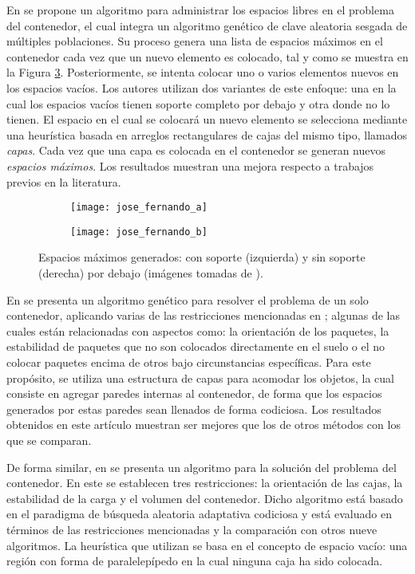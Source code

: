 En \cite{GONCALVES2012179} se propone un algoritmo para administrar los espacios libres en el problema del contenedor, el cual integra un algoritmo genético de clave aleatoria sesgada de múltiples poblaciones.
Su proceso genera una lista de espacios máximos en el contenedor cada vez que un nuevo elemento es colocado, tal y como se muestra en la Figura \ref{fig:GONCALVES2012179}.
Posteriormente, se intenta colocar uno o varios elementos nuevos en los espacios vacíos.
Los autores utilizan dos variantes de este enfoque: una en la cual los espacios vacíos tienen soporte completo por debajo y otra donde no lo tienen.
El espacio en el cual se colocará un nuevo elemento se selecciona mediante una heurística basada en arreglos rectangulares de cajas del mismo tipo, llamados \textsl{capas}.
Cada vez que una capa es colocada en el contenedor se generan nuevos \textsl{espacios máximos}.
Los resultados muestran una mejora respecto a trabajos previos en la literatura.
%
\begin{figure}[H]
	\begin{subfigure}{0.22\linewidth}
		\texttt{[image: jose\_fernando\_a]}%
		\label{subfig:con_soporte}%
	\end{subfigure}%
	\hspace{1.8cm}%
	\begin{subfigure}{0.22\textwidth}
		\texttt{[image: jose\_fernando\_b]}%
		\label{subfig:sin_soporte}%
	\end{subfigure}%
	\caption{Espacios máximos generados: con soporte (izquierda) y sin soporte (derecha) por debajo (imágenes tomadas de \cite{GONCALVES2012179}).}%
	\label{fig:GONCALVES2012179}%
\end{figure}
%
En \cite{BORTFELDT2001143} se presenta un algoritmo genético para resolver el problema de un solo contenedor, aplicando varias de las restricciones mencionadas en \cite{BISCHOFF1995377}; algunas de las cuales están relacionadas con aspectos como: la orientación de los paquetes, la estabilidad de paquetes que no son colocados directamente en el suelo o el no colocar paquetes encima de otros bajo circunstancias específicas.
Para este propósito, se utiliza una estructura de capas para acomodar los objetos, la cual consiste en agregar paredes internas al contenedor, de forma que los espacios generados por estas paredes sean llenados de forma codiciosa.
Los resultados obtenidos en este artículo muestran ser mejores que los de otros métodos con los que se comparan.

De forma similar, en \cite{1492318} se presenta un algoritmo para la solución del problema del contenedor.
En este se establecen tres restricciones: la orientación de las cajas, la estabilidad de la carga y el volumen del contenedor.
Dicho algoritmo está basado en el paradigma de búsqueda aleatoria adaptativa codiciosa y está evaluado en términos de las restricciones mencionadas y la comparación con otros nueve algoritmos.
La heurística que utilizan se basa en el concepto de espacio vacío: una región con forma de paralelepípedo en la cual ninguna caja ha sido colocada.

